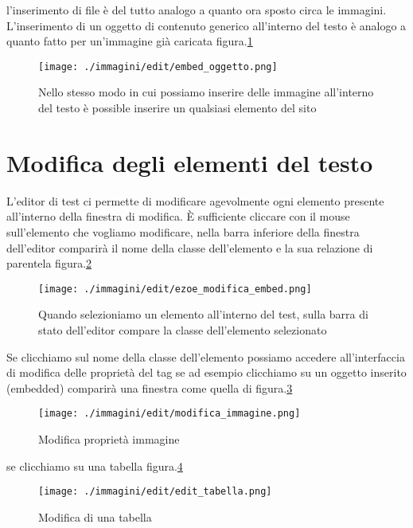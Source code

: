 l'inserimento di file è del tutto analogo a quanto ora sposto circa le immagini. L'inserimento di un oggetto di contenuto generico all'interno del testo è analogo a quanto fatto per  un'immagine già caricata figura.\ref{fig:embed_ogg}


\begin{figure}[H]
 \centering
 \texttt{[image: ./immagini/edit/embed\_oggetto.png]}
 \caption{Nello stesso modo in cui possiamo inserire delle immagine all'interno del testo è possible inserire un qualsiasi elemento del sito}
 \label{fig:embed_ogg}
\end{figure}

\section{Modifica degli elementi del testo}

L'editor di test ci permette di modificare agevolmente ogni elemento presente all'interno della finestra di modifica. È sufficiente cliccare con il mouse sull'elemento che vogliamo modificare, nella barra inferiore della finestra dell'editor comparirà il nome della classe dell'elemento e la sua relazione di parentela figura.\ref{fig:ezoe_mod}

\begin{figure}[H]
 \centering
 \texttt{[image: ./immagini/edit/ezoe\_modifica\_embed.png]}
 \caption{Quando selezioniamo un elemento all'interno del test, sulla barra di stato dell'editor compare la classe dell'elemento selezionato}
 \label{fig:ezoe_mod}
\end{figure}

Se clicchiamo sul nome della classe dell'elemento possiamo accedere all'interfaccia di modifica delle proprietà del tag se ad esempio clicchiamo su un oggetto inserito (embedded) comparirà una finestra come quella di figura.\ref{fig:edit_image}


\begin{figure}[H]
 \centering
 \texttt{[image: ./immagini/edit/modifica\_immagine.png]}
 \caption{Modifica proprietà immagine}
 \label{fig:edit_image}
\end{figure}


se clicchiamo su una tabella figura.\ref{fig:edit_tabella}


\begin{figure}[H]
 \centering
 \texttt{[image: ./immagini/edit/edit\_tabella.png]}
 \caption{Modifica di una tabella}
 \label{fig:edit_tabella}
\end{figure}
